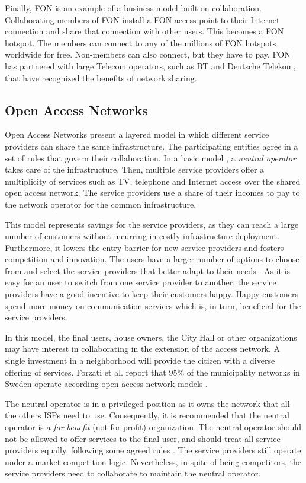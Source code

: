 \documentclass[journal]{IEEEtran}
\begin{document}
Finally, FON is an example of a business model built on collaboration.
Collaborating members of FON install a FON access point to their Internet connection and share that connection with other users.
This becomes a FON hotspot.
The members can connect to any of the millions of FON hotspots worldwide for free.
Non-members can also connect, but they have to pay.
FON has partnered with large Telecom operators, such as BT and Deutsche Telekom, that have recognized the benefits of network sharing.


\subsection{Open Access Networks}

Open Access Networks present a layered model in which different service providers can share the same infrastructure.
The participating entities agree in a set of rules that govern their collaboration.
In a basic model \cite{battiti2005wireless}, a \emph{neutral operator} takes care of the infrastructure.
Then, multiple service providers offer a multiplicity of services such as TV, telephone and Internet access over the shared open access network.
The service providers use a share of their incomes to pay to the network operator for the common infrastructure.

This model represents savings for the service providers, as they can reach a large number of customers without incurring in costly infrastructure deployment.
Furthermore, it lowers the entry barrier for new service providers and fosters competition and innovation.
The users have a larger number of options to choose from and select the service providers that better adapt to their needs \cite{domingo2011med}.
As it is easy for an user to switch from one service provider to another, the service providers have a good incentive to keep their customers happy.
Happy customers spend more money on communication services which is, in turn, beneficial for the service providers.

In this model, the final users, house owners, the City Hall or other organizations may have interest in collaborating in the extension of the access network.
A single investment in a neighborhood will provide the citizen with a diverse offering of services.
Forzati et al. report that 95\% of the municipality networks in Sweden operate according open access network models \cite{forzati2010open}.

The neutral operator is in a privileged position as it owns the network that all the others ISPs need to use.
Consequently, it is recommended that the neutral operator is a \emph{for benefit} (not for profit) organization.
The neutral operator should not be allowed to offer services to the final user, and should treat all service providers equally, following some agreed rules \cite{battiti2005wireless}.
The service providers still operate under a market competition logic.
Nevertheless, in spite of being competitors, the service providers need to collaborate to maintain the neutral operator.
\end{document}

